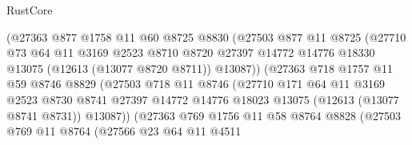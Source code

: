\begin{lexlean}{RustCore}
\begin{coremodule}
                          (@27363
                            @877
                            @1758
                            @11
                            @60
                            @8725
                            @8830
                            (@27503
                              @877
                              @11
                              @8725
                              (@27710
                                @73
                                @64
                                @11
                                @3169
                                @2523
                                @8710
                                @8720
                                @27397
                                @14772
                                @14776
                                @18330
                                @13075
                                (@12613 (@13077 @8720 @8711))
                                @13087))
                            (@27363
                              @718
                              @1757
                              @11
                              @59
                              @8746
                              @8829
                              (@27503
                                @718
                                @11
                                @8746
                                (@27710
                                  @171
                                  @64
                                  @11
                                  @3169
                                  @2523
                                  @8730
                                  @8741
                                  @27397
                                  @14772
                                  @14776
                                  @18023
                                  @13075
                                  (@12613 (@13077 @8741 @8731))
                                  @13087))
                              (@27363
                                @769
                                @1756
                                @11
                                @58
                                @8764
                                @8828
                                (@27503
                                  @769
                                  @11
                                  @8764
                                  (@27566
                                    @23
                                    @64
                                    @11
                                    @4511

\end{coremodule}
\end{lexlean}
